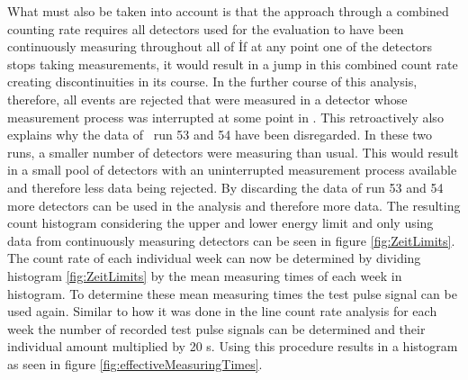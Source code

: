 \documentclass[encoding=utf8,british]{tumphthesis}
\begin{document}
What must also be taken into account is that the approach through a combined counting rate requires all detectors used for the evaluation to have been continuously measuring throughout all of \PII\.
If at any point one of the detectors stops taking measurements, it would result in a jump in this combined count rate creating discontinuities in its course.    
In the further course of this analysis, therefore, all events are rejected that were measured in a detector whose measurement process was interrupted at some point in \PII.
This retroactively also explains why the data of \gerda\ run 53 and 54 have been disregarded.
In these two runs, a smaller number of detectors were measuring than usual.
This would result in a small pool of detectors with an uninterrupted measurement process available and therefore less data being rejected.
By discarding the data of run 53 and 54 more detectors can be used in the analysis and therefore more data.
The resulting count histogram considering the upper and lower energy limit and only using data from continuously measuring detectors can be seen in figure \ref{fig:ZeitLimits}.
\\

The count rate of each individual week can now be determined by dividing histogram \ref{fig:ZeitLimits} by the mean measuring times of each week in histogram.
To determine these mean measuring times the test pulse signal can be used again.
Similar to how it was done in the line count rate analysis for each week the number of recorded test pulse signals can be determined and their individual amount multiplied by 20 s.
Using this procedure results in a histogram as seen in figure \ref{fig:effectiveMeasuringTimes}.
\\
\end{document}
